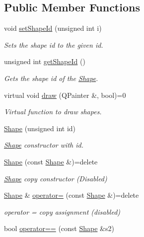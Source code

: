 \subsection*{Public Member Functions}
\begin{DoxyCompactItemize}
\item 
void \hyperlink{classShape_a95f42a7833e43572d684455c2ee232ec}{set\+Shape\+Id} (unsigned int i)
\begin{DoxyCompactList}\small\item\em Sets the shape id to the given id. \end{DoxyCompactList}\item 
unsigned int \hyperlink{classShape_a3ac221427e91b0acc53a2f3764a8f01b}{get\+Shape\+Id} ()
\begin{DoxyCompactList}\small\item\em Gets the shape id of the \hyperlink{classShape}{Shape}. \end{DoxyCompactList}\item 
virtual void \hyperlink{classShape_a47dae32819e64fb32f3357f31978293f}{draw} (Q\+Painter \&, bool)=0
\begin{DoxyCompactList}\small\item\em Virtual function to draw shapes. \end{DoxyCompactList}\item 
\hyperlink{classShape_a3bb93456832521010106172a095e22ca}{Shape} (unsigned int id)
\begin{DoxyCompactList}\small\item\em \hyperlink{classShape}{Shape} constructor with id. \end{DoxyCompactList}\item 
\hyperlink{classShape_a44d91c7621d4d7af60fe3320a2e07279}{Shape} (const \hyperlink{classShape}{Shape} \&)=delete
\begin{DoxyCompactList}\small\item\em \hyperlink{classShape}{Shape} copy constructor (Disabled) \end{DoxyCompactList}\item 
\hyperlink{classShape}{Shape} \& \hyperlink{classShape_a9b9942917d6e6c359a8751156ed52423}{operator=} (const \hyperlink{classShape}{Shape} \&)=delete
\begin{DoxyCompactList}\small\item\em operator = copy assignment (disabled) \end{DoxyCompactList}\item 
bool \hyperlink{classShape_a1e81a927f61ea4d12daafc1d9295e00a}{operator==} (const \hyperlink{classShape}{Shape} \&s2)

\end{DoxyCompactItemize}
